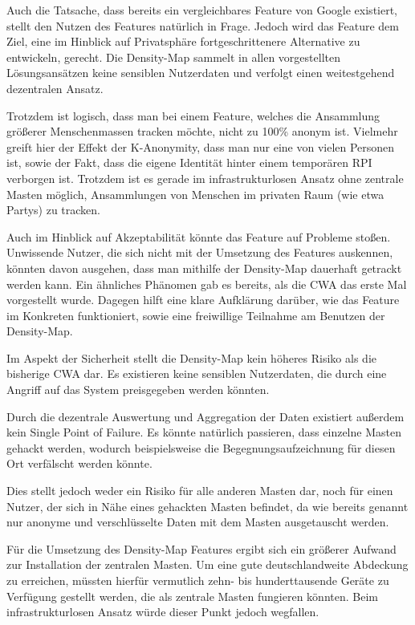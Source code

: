 \documentclass[conference,compsoc]{IEEEtran}
\begin{document}
Auch die Tatsache, dass bereits ein vergleichbares Feature von Google existiert, stellt den Nutzen des Features natürlich in Frage.
Jedoch wird das Feature dem Ziel, eine im Hinblick auf Privatsphäre fortgeschrittenere Alternative zu entwickeln, gerecht. 
Die Density-Map sammelt in allen vorgestellten Lösungsansätzen keine sensiblen Nutzerdaten und verfolgt einen weitestgehend dezentralen Ansatz.

Trotzdem ist logisch, dass man bei einem Feature, welches die Ansammlung größerer Menschenmassen tracken möchte, nicht zu 100\% anonym ist.
Vielmehr greift hier der Effekt der K-Anonymity, dass man nur eine von vielen Personen ist, sowie der Fakt, dass die eigene Identität hinter einem temporären RPI verborgen ist.
Trotzdem ist es gerade im infrastrukturlosen Ansatz ohne zentrale Masten möglich, Ansammlungen von Menschen im privaten Raum (wie etwa Partys) zu tracken.

Auch im Hinblick auf Akzeptabilität könnte das Feature auf Probleme stoßen.
Unwissende Nutzer, die sich nicht mit der Umsetzung des Features auskennen, könnten davon ausgehen, dass man mithilfe der Density-Map dauerhaft getrackt werden kann.
Ein ähnliches Phänomen gab es bereits, als die CWA das erste Mal vorgestellt wurde.
Dagegen hilft eine klare Aufklärung darüber, wie das Feature im Konkreten funktioniert, sowie eine freiwillige Teilnahme am Benutzen der Density-Map.

Im Aspekt der Sicherheit stellt die Density-Map kein höheres Risiko als die bisherige CWA dar.
Es existieren keine sensiblen Nutzerdaten, die durch eine Angriff auf das System preisgegeben werden könnten. 

Durch die dezentrale Auswertung und Aggregation der Daten existiert außerdem kein Single Point of Failure.
Es könnte natürlich passieren, dass einzelne Masten gehackt werden, wodurch beispielsweise die Begegnungsaufzeichnung für diesen Ort verfälscht werden könnte.

Dies stellt jedoch weder ein Risiko für alle anderen Masten dar, noch für einen Nutzer, der sich in Nähe eines gehackten Masten befindet,
da wie bereits genannt nur anonyme und verschlüsselte Daten mit dem Masten ausgetauscht werden.

Für die Umsetzung des Density-Map Features ergibt sich ein größerer Aufwand zur Installation der zentralen Masten.
Um eine gute deutschlandweite Abdeckung zu erreichen, müssten hierfür vermutlich zehn- bis hunderttausende Geräte zu Verfügung gestellt werden, die als zentrale Masten fungieren könnten.
Beim infrastrukturlosen Ansatz würde dieser Punkt jedoch wegfallen.
\end{document}
